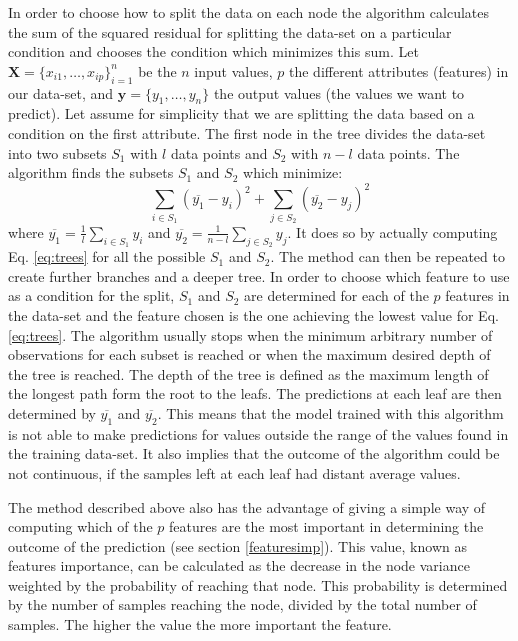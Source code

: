 In order to choose how to split the data on each node the algorithm calculates the sum of the squared residual for splitting the data-set on a particular condition and chooses the condition which minimizes this sum. Let $\bm{X} = \{x_{i1},\ldots ,x_{ip}\}_{i=1}^{n}$ be the $n$ input values, $p$ the different attributes (features) in our data-set, and $\mathbf{y} = \{y_{1},\ldots ,y_{n}\}$ the output values (the values we want to predict). Let assume for simplicity that we are splitting the data based on a condition on the first attribute. The first node in the tree divides the data-set into two subsets $S_1$ with $l$ data points and $S_2$ with $n-l$ data points. The algorithm finds the subsets $S_1$ and $S_2$ which minimize:
\begin{equation}\label{eq:trees}
\sum_{i \in S_1}(\overline{y_1}-y_i)^2 + \sum_{j \in S_2}(\overline{y_2}-y_j)^2
\end{equation}
where  $\overline{y_1} = \frac{1}{l}\sum_{i \in S_1}y_i$ and $\overline{y_2} = \frac{1}{n-l}\sum_{j \in S_2}y_j$. It does so by actually computing Eq. \ref{eq:trees} for all the possible $S_1$ and $S_2$. The method can then be repeated to create further branches and a deeper tree. In order to choose which feature to use as a condition for the split, $S_1$ and $S_2$ are determined for each of the $p$ features in the data-set and the feature chosen is the one achieving the lowest value for Eq. \ref{eq:trees}. The algorithm usually stops when the minimum arbitrary number of observations for each subset is reached or when the maximum desired depth of the tree is reached. The depth of the tree is defined as the maximum length of the longest path form the root to the leafs. The predictions at each leaf are then determined by $\overline{y_1}$ and $\overline{y_2}$. This means that the model trained with this algorithm is not able to make predictions for values outside the range of the values found in the training data-set. It also implies that the outcome of the algorithm could be not continuous, if the samples left at each leaf had distant average values. 

The method described above also has the advantage of giving a simple way of computing which of the $p$ features are the most important in determining the outcome of the prediction (see section \ref{featuresimp}). This value, known as features importance, can be calculated as the decrease in the node variance weighted by the probability of reaching that node. This probability is determined by the number of samples reaching the node, divided by the total number of samples. The higher the value the more important the feature.

